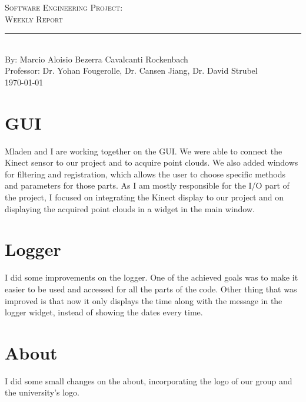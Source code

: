 \documentclass[aps,letterpaper,11pt]{revtex4}
\newcommand{\labno}{Software Engineering Project}
\newcommand{\labtitle}{Weekly Report}
\newcommand{\authorname}{Marcio Aloisio Bezerra Cavalcanti Rockenbach}
\newcommand{\professor}{Dr. Yohan Fougerolle, Dr. Cansen Jiang, Dr. David Strubel}
\begin{document}
  
\begin{titlepage}
\begin{center}
{\LARGE \textsc{\labno:} \\ \vspace{4pt}}
{\Large \textsc{\labtitle} \\ \vspace{4pt}} 
\rule[13pt]{\textwidth}{1pt} \\ \vspace{150pt}
{\large By: \authorname \\ \vspace{10pt}
Professor: \professor \\ \vspace{10pt}
\today}
\end{center}


\end{titlepage}%
\newpage
\setlength{\parindent}{5ex}

\section{GUI}
Mladen and I are working together on the GUI. We were able to connect the Kinect sensor to our project and to acquire point clouds. We also added windows for filtering and registration, which allows the user to choose specific methods and parameters for those parts.
As I am mostly responsible for the I/O part of the project, I focused on integrating the Kinect display to our project and on displaying the acquired point clouds in a widget in the main window.

\section{Logger}
I did some improvements on the logger. One of the achieved goals was to make it easier to be used and accessed for all the parts of the code. Other thing that was improved is that now it only displays the time along with the message in the logger widget, instead of showing the dates every time.

\section{About}
I did some small changes on the about, incorporating the logo of our group and the university's logo.
\end{document}
